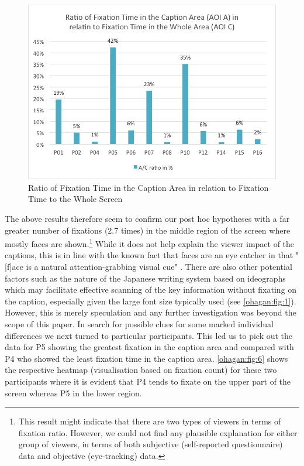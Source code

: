 \documentclass[output=paper]{langsci/langscibook}
\begin{document}
\begin{figure}
 \includegraphics[width=\textwidth]{figures/OHagan5.png}
\caption{Ratio of Fixation Time in the Caption Area in relation to Fixation Time to the Whole Screen}
\label{ohagan:fig:5}
\end{figure}


The above results therefore seem to confirm our post hoc hypotheses with a far greater number of fixations (2.7 times) in the middle region of the screen where mostly faces are shown.\footnote{ This result might indicate that there are two types of viewers in terms of fixation ratio. However, we could not find any plausible explanation for either group of viewers, in terms of both subjective (self-reported questionnaire) data and objective (eye-tracking) data.} While it does not help explain the viewer impact of the captions, this is in line with the known fact that faces are an eye catcher in that "[f]ace is a natural attention-grabbing visual cue" \citep[p. 264]{perego2010}. There are also other potential factors such as the nature of the Japanese writing system based on ideographs which may facilitate effective scanning of the key information without fixating on the caption, especially given the large font size typically used (see \ref{ohagan:fig:1}). However, this is merely speculation and any further investigation was beyond the scope of this paper. In search for possible clues for some marked individual differences we next turned to particular participants.  This led us to pick out the data for P5 showing the greatest fixation in the caption area and compared with P4 who showed the least fixation time in the caption area.  \ref{ohagan:fig:6} shows the respective heatmap (visualisation based on fixation count) for these two participants where it is evident that P4 tends to fixate on the upper part of the screen whereas P5 in the lower region.
\end{document}
